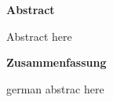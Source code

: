 

%
%
{
\pagestyle{empty}
\begin{center}
{\sffamily \bfseries\Large Abstract}\\
\end{center}%
\vspace{1cm}
%
Abstract here
\vspace{1.5cm}

%
\begin{center}
{\sffamily \bfseries\Large Zusammenfassung}\\
\end{center}%
\vspace{1cm}
%
german abstrac here

\newpage
\pagestyle{plain}
}
